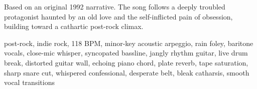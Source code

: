 
\label{sec:evi-sem-yike}

\begin{notes}
Based on an original 1992 narrative. %
The song follows a deeply troubled protagonist haunted by an old love and the self-inflicted pain of obsession, building toward a cathartic post-rock climax.
\end{notes}

\begin{style}
post-rock, indie rock, 118 BPM, minor-key acoustic arpeggio, rain foley, baritone vocals, close-mic whisper, syncopated bassline, jangly rhythm guitar, live drum break, distorted guitar wall, echoing piano chord, plate reverb, tape saturation, sharp snare cut, whispered confessional, desperate belt, bleak catharsis, smooth vocal transitions
\end{style}

